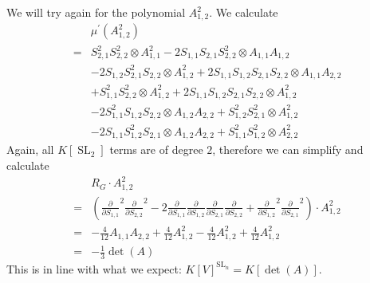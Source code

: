 \begin{example}
  We will try again for the polynomial $A_{1,2}^2$.
  We calculate
  \begin{equation}
    \begin{aligned}
      &\mu^\prime ( A_{1,2}^2 ) \\
      =& S_{2,1}^2 S_{2,2}^2 \otimes A_{1,1}^2
      - 2S_{1,1}S_{2,1}S_{2,2}^2 \otimes A_{1,1}A_{1,2} \\
      &- 2S_{1,2}S_{2,1}^2S_{2,2} \otimes A_{1,2}^2 
      + 2S_{1,1}S_{1,2}S_{2,1}S_{2,2} \otimes A_{1,1}A_{2,2}\\
      &+ S_{1,1}^2S_{2,2}^2 \otimes A_{1,2}^2
      + 2S_{1,1}S_{1,2}S_{2,1}S_{2,2} \otimes A_{1,2}^2 \\
      &- 2S_{1,1}^2S_{1,2}S_{2,2} \otimes A_{1,2}A_{2,2}
      + S_{1,2}^2S_{2,1}^2 \otimes A_{1,2}^2 \\
      &- 2S_{1,1}S_{1,2}^2S_{2,1} \otimes A_{1,2}A_{2,2}
      + S_{1,1}^2S_{1,2}^2 \otimes A_{2,2}^2
    \end{aligned}
  \end{equation}
  Again, all $K[\operatorname{SL}_2]$ terms are of degree $2$, therefore we can simplify and calculate
  \begin{equation}
    \begin{aligned}
      &R_G \cdot A_{1,2}^2\\
      =& \left( \frac{\partial}{\partial S_{1,1}}^2 \frac{\partial}{\partial S_{2,2}}^2 - 2 \frac{\partial}{\partial S_{1,1}} \frac{\partial}{\partial S_{1,2}} \frac{\partial}{\partial S_{2,1}} \frac{\partial}{\partial S_{2,2}} + \frac{\partial}{\partial S_{1,2}}^2\frac{\partial}{\partial S_{2,1}}^2 \right) \cdot A_{1,2}^2 \\
      =& - \frac{4}{12} A_{1,1}A_{2,2} + \frac{4}{12} A_{1,2}^2 - \frac{4}{12} A_{1,2}^2 + \frac{4}{12} A_{1,2}^2 \\
      =& -\frac{1}{3}\operatorname{det}(A)
    \end{aligned}
  \end{equation}
  This is in line with what we expect: $K[V]^{\operatorname{SL}_n} = K[\operatorname{det}(A)]$.
\end{example}

